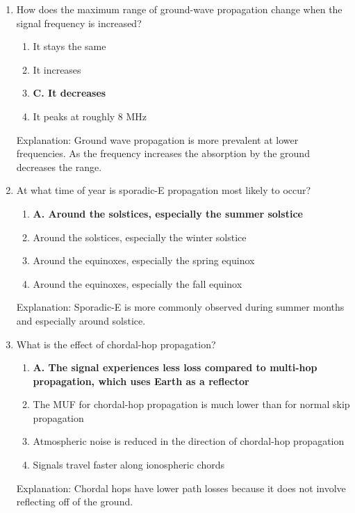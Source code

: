 \begin{enumerate}
     \item How does the maximum range of ground-wave propagation change when the signal frequency is increased?
        \begin{enumerate}
         \item  It stays the same
        \item  It increases
         \item \textbf{C. It decreases}
        \item  It peaks at roughly 8 MHz
        \end{enumerate}
       \textcolor{myred}{Explanation:}
    Ground wave propagation is more prevalent at lower frequencies. As the frequency increases the absorption by the ground decreases the range.
       
        \item At what time of year is sporadic-E propagation most likely to occur?
        \begin{enumerate}
    \item \textbf{A. Around the solstices, especially the summer solstice}
     \item  Around the solstices, especially the winter solstice
      \item  Around the equinoxes, especially the spring equinox
    \item  Around the equinoxes, especially the fall equinox
      \end{enumerate}
       \textcolor{myred}{Explanation:}
       Sporadic-E is more commonly observed during summer months and especially around solstice.

   \item What is the effect of chordal-hop propagation?
        \begin{enumerate}
           \item \textbf{A. The signal experiences less loss compared to multi-hop propagation, which uses Earth as a reflector}
        \item  The MUF for chordal-hop propagation is much lower than for normal skip propagation
     \item  Atmospheric noise is reduced in the direction of chordal-hop propagation
        \item  Signals travel faster along ionospheric chords
        \end{enumerate}
    \textcolor{myred}{Explanation:}
        Chordal hops have lower path losses because it does not involve reflecting off of the ground.
   

\end{enumerate}
